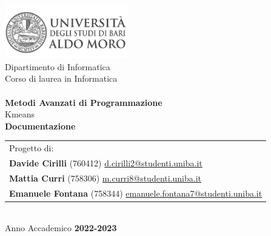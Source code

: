 \begin{titlepage}
    \begin{center}
        \includegraphics[width=0.4\textwidth]{img/logo_uniba}\\
        \vspace{1cm}
        {\large Dipartimento di Informatica}\\
        \vspace{1cm}
        {\large Corso di laurea in Informatica}\\
        \hrulefill \\
        \vspace{2cm}
        {\large \textbf{Metodi Avanzati di Programmazione}}\\
        \vspace{0.5cm}
        {\large Kmeans}\\
        \vspace{2cm}
        {\LARGE\textbf{Documentazione}}\\
        \vspace{2cm}

        \vfill
        
    
        \begin{table}[ht]
          \centering
          \begin{tabularx}{\textwidth}{@{}X@{}}
              Progetto di: \\
              \textbf{Davide Cirilli} (760412) \href{mailto:d.cirilli2@studenti.uniba.it}{d.cirilli2@studenti.uniba.it} \\
              \textbf{Mattia Curri} (758306) \href{mailto:m.curri8@studenti.uniba.it}{m.curri8@studenti.uniba.it} \\
              \textbf{Emanuele Fontana} (758344) \href{mailto:emanuele.fontana7@studenti.uniba.it}{emanuele.fontana7@studenti.uniba.it}\\
          \end{tabularx}
      \end{table}

        \vspace{1cm}
        \hrulefill \\
        \vspace{1cm}
        {\large Anno Accademico \textbf{2022-2023}}
    \end{center}
\end{titlepage}